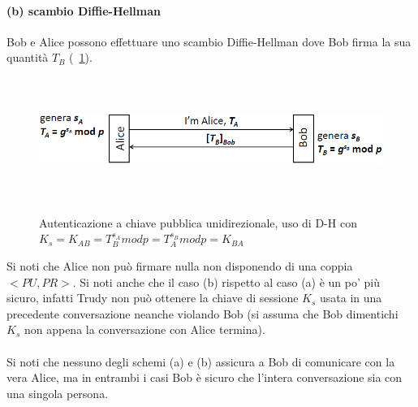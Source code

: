 \paragraph{(b) scambio Diffie-Hellman} 
Bob e Alice possono effettuare uno scambio Diffie-Hellman dove Bob firma la sua quantità $T_{B}$ (\figurename~\ref{fig:ImgS82bis}).
\begin{figure}[htbp]
	\centering%
	\subfigure%
	{\includegraphics[height=4cm, width=12cm, keepaspectratio]{Immagini/autenticazione/ImgS82bis.png}}
	\caption{Autenticazione a chiave pubblica unidirezionale, uso di D-H con $K_{s} = K_{AB} = T_{B}^{s_{A}}modp = T_{A}^{s_{B}}modp = K_{BA}$}\label{fig:ImgS82bis} 	
\end{figure}
Si noti che Alice non può firmare nulla non disponendo di una coppia $<PU, PR>$. Si noti anche che il caso (b) rispetto al caso (a) è un po' più sicuro, infatti Trudy non può ottenere la chiave di sessione $K_{s}$ usata in una precedente conversazione neanche violando Bob (si assuma che Bob dimentichi $K_{s}$ non appena la conversazione con Alice termina).\\ \\
Si noti che nessuno degli schemi (a) e (b) assicura a Bob di comunicare con la vera Alice,  ma in entrambi i casi Bob è sicuro che l'intera conversazione sia con una singola persona.
